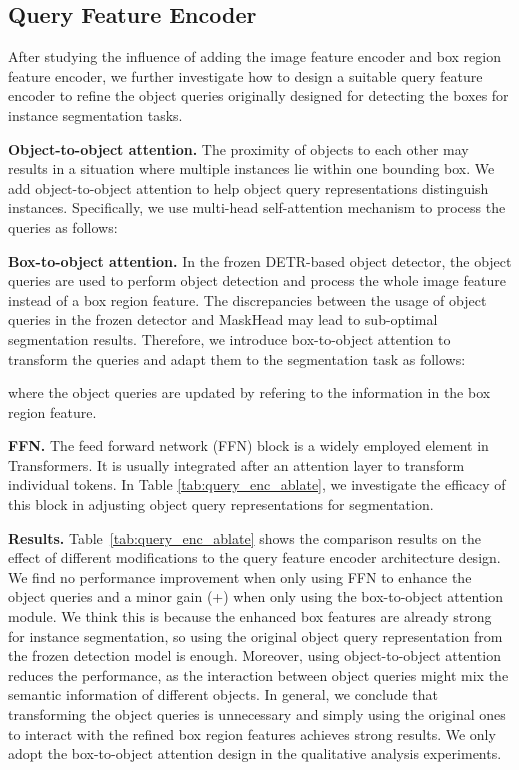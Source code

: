 \documentclass[10pt,twocolumn,letterpaper]{article}
\begin{document}
\subsection{Query Feature Encoder}
After studying the influence of adding the image feature encoder and box region feature encoder, we further investigate how to design a suitable query feature encoder to refine the object queries originally designed for detecting the boxes for instance segmentation tasks.

\vspace{1mm}
\noindent\textbf{Object-to-object attention.}
The proximity of objects to each other may results in a situation where multiple instances lie within one bounding box. We add object-to-object attention to help object query representations distinguish instances. Specifically, we use multi-head self-attention mechanism to process the queries as follows:



\vspace{1mm}
\noindent\textbf{Box-to-object attention.}
In the frozen DETR-based object detector, the object queries are used to perform object detection and process the whole image feature instead of a box region feature. The discrepancies between the usage of object queries in the frozen detector and MaskHead may lead to sub-optimal segmentation results. Therefore, we introduce box-to-object attention to transform the queries and adapt them to the segmentation task as follows:

where the object queries are updated by refering to the information in the box region feature.

\vspace{1mm}
\noindent\textbf{FFN.}
The feed forward network (FFN) block is a widely employed element in Transformers. It is usually integrated after an attention layer to transform individual tokens. In Table \ref{tab:query_enc_ablate}, we investigate the efficacy of this block in adjusting object query representations for segmentation. 

\vspace{1mm}
\noindent\textbf{Results.}
Table~\ref{tab:query_enc_ablate} shows the comparison results on the effect of different modifications to the query feature encoder architecture design.
We find no performance improvement when only using FFN to enhance the object queries and a minor gain (+) when only using the box-to-object attention module. We think this is because the enhanced box features are already strong for instance segmentation, so using the original object query representation from the frozen detection model is enough. Moreover, using object-to-object attention reduces the performance, as the interaction between object queries might mix the semantic information of different objects. In general, we conclude that transforming the object queries is unnecessary and simply using the original ones to interact with the refined box region features achieves strong results.
We only adopt the box-to-object attention design in the qualitative analysis experiments.
\end{document}
